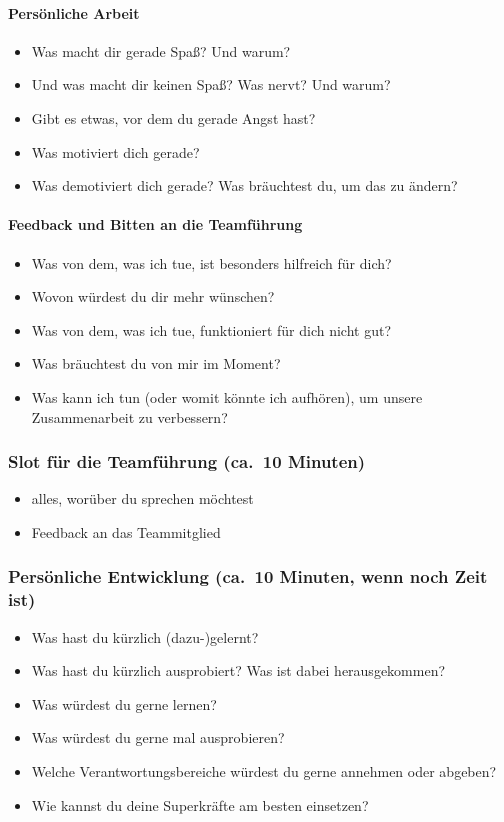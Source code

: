 \paragraph{Persönliche Arbeit}
\begin{itemize}
    \item Was macht dir gerade Spaß? Und warum?
    \item Und was macht dir keinen Spaß? Was nervt? Und warum?
    \item Gibt es etwas, vor dem du gerade Angst hast?
    \item Was motiviert dich gerade?
    \item Was demotiviert dich gerade? Was bräuchtest du, um das zu ändern?
\end{itemize}

\paragraph{Feedback und Bitten an die Teamführung}
\begin{itemize}
    \item Was von dem, was ich tue, ist besonders hilfreich für dich?
    \item Wovon würdest du dir mehr wünschen?
    \item Was von dem, was ich tue, funktioniert für dich nicht gut?
    \item Was bräuchtest du von mir im Moment?
    \item Was kann ich tun (oder womit könnte ich aufhören), um unsere Zusammenarbeit zu verbessern?
\end{itemize}

\subsubsection{Slot für die Teamführung (ca.~10 Minuten)}
\begin{itemize}
    \item alles, worüber du sprechen möchtest
    \item Feedback an das Teammitglied
\end{itemize}

\subsubsection{Persönliche Entwicklung (ca.~10 Minuten, wenn noch Zeit ist)}
\begin{itemize}
    \item Was hast du kürzlich (dazu-)gelernt?
    \item Was hast du kürzlich ausprobiert? Was ist dabei herausgekommen?
    \item Was würdest du gerne lernen?
    \item Was würdest du gerne mal ausprobieren?
    \item Welche Verantwortungsbereiche würdest du gerne annehmen oder abgeben?
    \item Wie kannst du deine Superkräfte am besten einsetzen?
\end{itemize}

